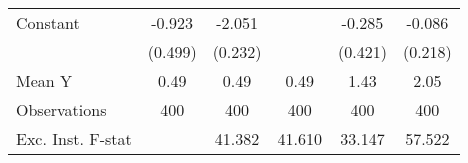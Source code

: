 {\begin{tabular}{l*{5}{c}}
\addlinespace
Constant            &      -0.923\sym{*}  &      -2.051\sym{***}&                     &      -0.285         &      -0.086         \\
                    &     (0.499)         &     (0.232)         &                     &     (0.421)         &     (0.218)         \\
\midrule
Mean Y              &        0.49         &        0.49         &        0.49         &        1.43         &        2.05         \\
Observations        &         400         &         400         &         400         &         400         &         400         \\
Exc. Inst. F-stat   &                     &      41.382         &      41.610         &      33.147         &      57.522         \\
\bottomrule
\end{tabular}
}
